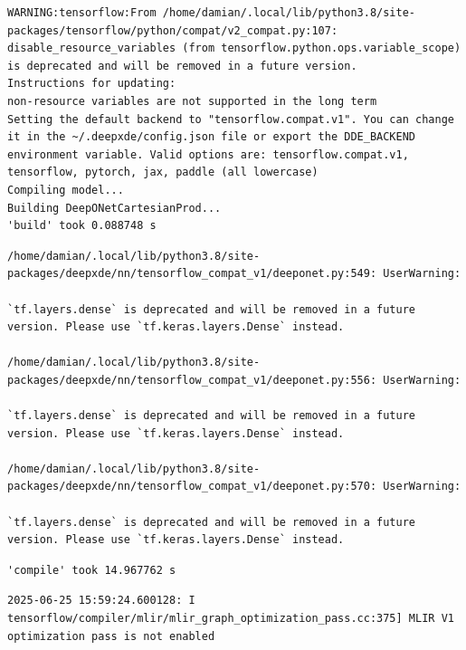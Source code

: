 \documentclass[
  spanish,
  us-letterpaper,
  DIV=11,
  numbers=noendperiod]{scrreprt}
\theoremstyle{plain}
\theoremstyle{definition}
\theoremstyle{remark}
\begin{document}
\begin{verbatim}
WARNING:tensorflow:From /home/damian/.local/lib/python3.8/site-packages/tensorflow/python/compat/v2_compat.py:107: disable_resource_variables (from tensorflow.python.ops.variable_scope) is deprecated and will be removed in a future version.
Instructions for updating:
non-resource variables are not supported in the long term
Setting the default backend to "tensorflow.compat.v1". You can change it in the ~/.deepxde/config.json file or export the DDE_BACKEND environment variable. Valid options are: tensorflow.compat.v1, tensorflow, pytorch, jax, paddle (all lowercase)
Compiling model...
Building DeepONetCartesianProd...
'build' took 0.088748 s
\end{verbatim}

\begin{verbatim}
/home/damian/.local/lib/python3.8/site-packages/deepxde/nn/tensorflow_compat_v1/deeponet.py:549: UserWarning:

`tf.layers.dense` is deprecated and will be removed in a future version. Please use `tf.keras.layers.Dense` instead.

/home/damian/.local/lib/python3.8/site-packages/deepxde/nn/tensorflow_compat_v1/deeponet.py:556: UserWarning:

`tf.layers.dense` is deprecated and will be removed in a future version. Please use `tf.keras.layers.Dense` instead.

/home/damian/.local/lib/python3.8/site-packages/deepxde/nn/tensorflow_compat_v1/deeponet.py:570: UserWarning:

`tf.layers.dense` is deprecated and will be removed in a future version. Please use `tf.keras.layers.Dense` instead.
\end{verbatim}

\begin{verbatim}
'compile' took 14.967762 s
\end{verbatim}

\begin{verbatim}
2025-06-25 15:59:24.600128: I tensorflow/compiler/mlir/mlir_graph_optimization_pass.cc:375] MLIR V1 optimization pass is not enabled
\end{verbatim}
\end{document}
